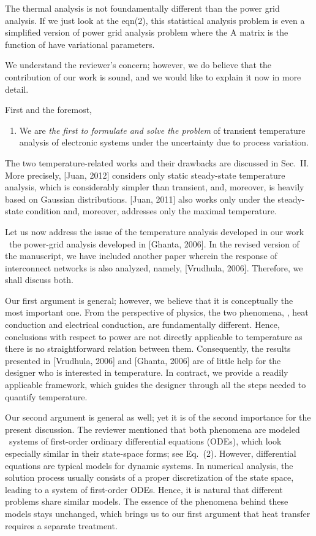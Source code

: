 \begin{reviewer}
[Comment 2] The thermal analysis is not foundamentally different than the power grid analysis.  If we just look at the eqn(2), this statistical analysis problem is even a simplified version of power grid analysis problem where the A matrix is the function of have variational parameters.
\end{reviewer}
\begin{authors}
We understand the reviewer's concern; however, we do believe that the contribution of our work is sound, and we would like to explain it now in more detail.

First and the foremost,
\begin{enumerate}
  \item We are \emph{the first to formulate and solve the problem} of transient temperature analysis of electronic systems under the uncertainty due to process variation.
\end{enumerate}
The two temperature-related works and their drawbacks are discussed in Sec.~II.
More precisely, [Juan, 2012] considers only static steady-state temperature analysis, which is considerably simpler than transient, and, moreover, is heavily based on Gaussian distributions.
[Juan, 2011] also works only under the steady-state condition and, moreover, addresses only the maximal temperature.

Let us now address the issue of the temperature analysis developed in our work \vs\ the power-grid analysis developed in [Ghanta, 2006].
In the revised version of the manuscript, we have included another paper wherein the response of interconnect networks is also analyzed, namely, [Vrudhula, 2006].
Therefore, we shall discuss both.

Our first argument is general; however, we believe that it is conceptually the most important one.
From the perspective of physics, the two phenomena, \ie, heat conduction and electrical conduction, are fundamentally different.
Hence, conclusions with respect to power are not directly applicable to temperature as there is no straightforward relation between them.
Consequently, the results presented in [Vrudhula, 2006] and [Ghanta, 2006] are of little help for the designer who is interested in temperature.
In contract, we provide a readily applicable framework, which guides the designer through all the steps needed to quantify temperature.

Our second argument is general as well; yet it is of the second importance for the present discussion.
The reviewer mentioned that both phenomena are modeled \via\ systems of first-order ordinary differential equations (ODEs), which look especially similar in their state-space forms; see Eq.~(2).
However, differential equations are typical models for dynamic systems.
In numerical analysis, the solution process usually consists of a proper discretization of the state space, leading to a system of first-order ODEs.
Hence, it is natural that different problems share similar models.
The essence of the phenomena behind these models stays unchanged, which brings us to our first argument that heat transfer requires a separate treatment.


\end{authors}

